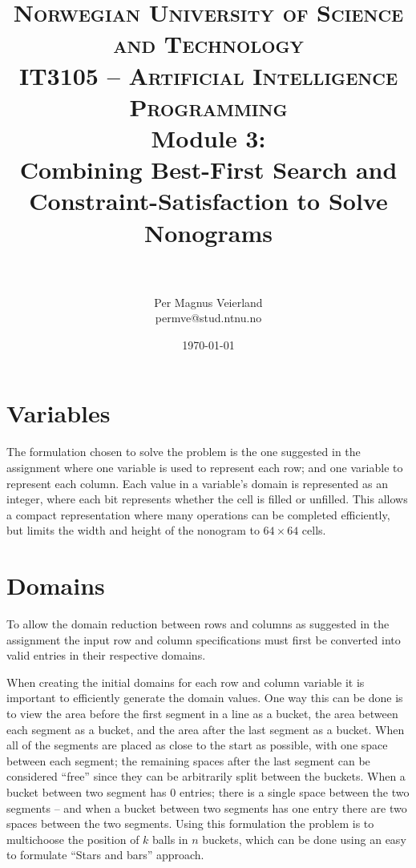 

\title{	
\normalfont \normalsize 
\textsc{Norwegian University of Science and Technology\\IT3105 -- Artificial Intelligence Programming}
\horrule{0.5pt} \\[0.4cm]
\huge Module 3:\\ Combining Best-First Search and Constraint-Satisfaction to Solve Nonograms\\
\horrule{2pt} \\[0.5cm]
}

\author{Per Magnus Veierland\\permve@stud.ntnu.no}

\date{\normalsize\today}




\maketitle

\section*{Variables}
The formulation chosen to solve the problem is the one suggested in the assignment where one variable is used to represent each row; and one variable to represent each column. Each value in a variable's domain is represented as an integer, where each bit represents whether the cell is filled or unfilled. This allows a compact representation where many operations can be completed efficiently, but limits the width and height of the nonogram to $64 \times 64$ cells.

\section*{Domains}
To allow the domain reduction between rows and columns as suggested in the assignment the input row and column specifications must first be converted into valid entries in their respective domains.

When creating the initial domains for each row and column variable it is important to efficiently generate the domain values. One way this can be done is to view the area before the first segment in a line as a bucket, the area between each segment as a bucket, and the area after the last segment as a bucket. When all of the segments are placed as close to the start as possible, with one space between each segment; the remaining spaces after the last segment can be considered ``free'' since they can be arbitrarily split between the buckets. When a bucket between two segment has 0 entries; there is a single space between the two segments -- and when a bucket between two segments has one entry there are two spaces between the two segments. Using this formulation the problem is to multichoose the position of $k$ balls in $n$ buckets, which can be done using an easy to formulate ``Stars and bars'' approach.

